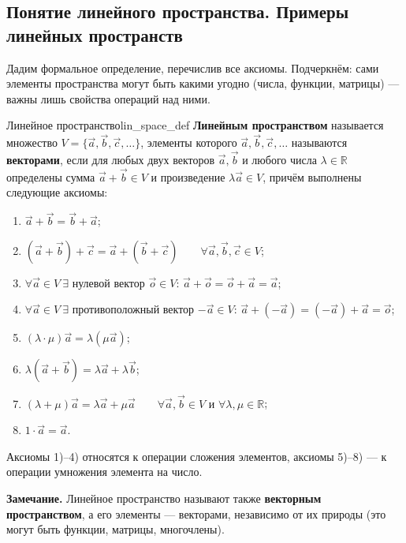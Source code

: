 \documentclass[12pt,a4paper]{article}
\begin{document}
\subsection*{Понятие линейного пространства. Примеры линейных пространств}

Дадим формальное определение, перечислив все аксиомы. Подчеркнём: сами
элементы пространства могут быть какими угодно (числа, функции,
матрицы) — важны лишь свойства операций над ними.

\begin{definition}{Линейное пространство}{lin_space_def}
  \textbf{Линейным пространством} называется множество
  $V = \{\vec{a}, \vec{b}, \vec{c}, \dots\}$, элементы которого
  $\vec{a}, \vec{b}, \vec{c}, \dots$ называются \textbf{векторами},
  если для любых двух векторов $\vec{a}, \vec{b}$ и любого числа
  $\lambda \in \mathbb{R}$ определены сумма $\vec{a} + \vec{b} \in V$ и
  произведение $\lambda\vec{a} \in V$, причём выполнены следующие
  аксиомы:
  \begin{enumerate}
    \item $\vec{a} + \vec{b} = \vec{b} + \vec{a}$;
    \item $(\vec{a} + \vec{b}) + \vec{c} = \vec{a} + (\vec{b} + \vec{c})
      \qquad \forall \vec{a}, \vec{b}, \vec{c} \in V$;
    \item $\forall \vec{a} \in V \ \exists$ нулевой вектор
      $\vec{o} \in V$: $\vec{a} + \vec{o} = \vec{o} + \vec{a} = \vec{a}$;
    \item $\forall \vec{a} \in V \ \exists$ противоположный вектор
      $-\vec{a} \in V$: $\vec{a} + (-\vec{a}) = (-\vec{a}) + \vec{a} = \vec{o}$;
    \item $(\lambda \cdot \mu)\vec{a} = \lambda(\mu\vec{a})$;
    \item $\lambda(\vec{a} + \vec{b}) = \lambda\vec{a} + \lambda\vec{b}$;
    \item $(\lambda + \mu)\vec{a} = \lambda\vec{a} + \mu\vec{a}
      \qquad \forall \vec{a}, \vec{b} \in V \text{ и } \forall
      \lambda, \mu \in \mathbb{R}$;
    \item $1 \cdot \vec{a} = \vec{a}$.
  \end{enumerate}
Аксиомы 1)--4) относятся к операции сложения элементов, аксиомы
5)--8) — к операции умножения элемента на число.
\end{definition}

\noindent\textbf{Замечание.} Линейное пространство называют также
\textbf{векторным пространством}, а его элементы — векторами,
независимо от их природы (это могут быть функции, матрицы, многочлены).
\end{document}
